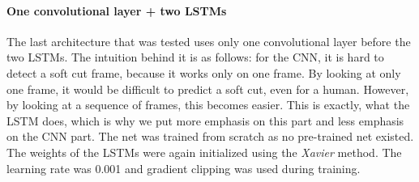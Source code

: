 \paragraph{One convolutional layer + two LSTMs}
The last architecture that was tested uses only one convolutional layer before the two LSTMs.
The intuition behind it is as follows: for the CNN, it is hard to detect a soft cut frame, because it works only on one frame.
By looking at only one frame, it would be difficult to predict a soft cut, even for a human.
However, by looking at a sequence of frames, this becomes easier.
This is exactly, what the LSTM does, which is why we put more emphasis on this part and less emphasis on the CNN part.
The net was trained from scratch as no pre-trained net existed.
The weights of the LSTMs were again initialized using the \textit{Xavier} method.
The learning rate was 0.001 and gradient clipping was used during training.

